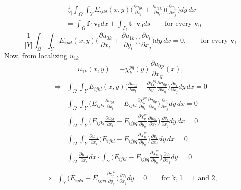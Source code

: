 \documentclass[10pt]{article}
\begin{document}
\begin{equation}\label{first}
\begin{aligned}
&\frac{1}{|Y|}\int_\Omega\int_Y E_{ijkl}(x,y)\bigg (\frac{\partial u_{0k}}{\partial x_l}+\frac{\partial u_{1k}}{\partial y_l}\bigg )\bigg (\frac{\partial v_{0i}}{\partial x_j}\bigg ) dy\,dx\\
&=\int_\Omega\textbf{f}\cdot\textbf{v}_0 dx + \int_{\Gamma_t}\textbf{t}\cdot\textbf{v}_0 ds \qquad \text{for every } \textbf{v}_0
\end{aligned}
\end{equation}
\begin{equation}
\frac{1}{|Y|}\int_\Omega\int_Y E_{ijkl}(x,y)\bigg (\frac{\partial u_{0k}}{\partial x_l}+\frac{\partial u_{1k}}{\partial y_l}\bigg )\bigg (\frac{\partial v_{i}}{\partial x_j}\bigg ) dy\,dx = 0, \qquad \text{for every } \textbf{v}_1
\end{equation}
Now, from localizing $u_{1k}$
\begin{equation}\label{localization}
u_{1k}(x,y)=-\chi^{pq}_k(y)\frac{\partial u_{0p}}{\partial x_q}(x),
\end{equation}
\begin{align*}
\Rightarrow &\int_\Omega\int_Y E_{ijkl}(x,y)\bigg (\frac{\partial u_{0k}}{\partial x_l}-\frac{\partial \chi^{pq}_k}{\partial y_l}\frac{\partial u_{0p}}{\partial x_q}\bigg )\frac{\partial v_{i}}{\partial x_j} dy\,dx=0\\
&\int_\Omega\int_Y \bigg (E_{ijkl}\frac{\partial u_{0k}}{\partial x_l}-E_{ijkl}\frac{\partial \chi^{pq}_k}{\partial y_l}\frac{\partial u_{0p}}{\partial x_q}\bigg )\frac{\partial v_{i}}{\partial x_j} dy\,dx=0\\
&\int_\Omega\int_Y \bigg (E_{ijkl}\frac{\partial u_{0k}}{\partial x_l}-E_{ijpq}\frac{\partial \chi^{kl}_p}{\partial y_q}\frac{\partial u_{0k}}{\partial x_l}\bigg )\frac{\partial v_{i}}{\partial x_j} dy\,dx=0\\
&\int_\Omega\int_Y \frac{\partial u_{0k}}{\partial x_l}\bigg (E_{ijkl}-E_{ijpq}\frac{\partial \chi^{kl}_p}{\partial y_q}\bigg )\frac{\partial v_{i}}{\partial x_j} dy\,dx=0\\
&\int_\Omega\frac{\partial u_{0k}}{\partial x_l}dx\cdot\int_Y \bigg (E_{ijkl}-E_{ijpq}\frac{\partial \chi^{kl}_p}{\partial y_q}\bigg )\frac{\partial v_{i}}{\partial x_j} dy\,=0\\
\end{align*}
\begin{align}
\Rightarrow &\int_Y \bigg (E_{ijkl}-E_{ijpq}\frac{\partial \chi^{kl}_p}{\partial y_q}\bigg )\frac{\partial v_{i}}{\partial x_j} dy=0  \qquad \text{for k, l = 1 and 2,}
\end{align}
\end{document}
